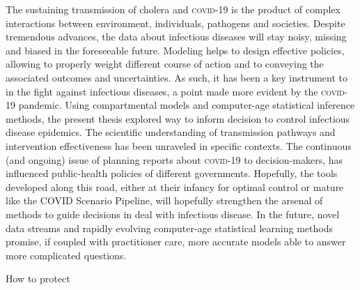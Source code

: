 The sustaining transmission of cholera and \textsc{covid}-19 is the product of complex interactions between environment, individuals, pathogens and societies. Despite tremendous advances, the data about infectious diseases will stay noisy, missing and biased in the foreseeable future. Modeling helps to design effective policies, allowing to properly weight different course of action and to conveying the associated outcomes and uncertainties. As such, it has been a key instrument to in the fight against infectious diseases, a point made more evident by the \textsc{covid}-19 pandemic. Using compartmental models and computer-age statistical inference methods, the present thesis explored way to inform decision to control infectious disease epidemics. The scientific understanding of transmission pathways and intervention effectiveness has been unraveled in specific contexts. The continuous (and ongoing) issue of planning reports about \textsc{covid}-19 to decision-makers, has influenced public-health policies of different governments. Hopefully, the tools developed along this road, either at their infancy for optimal control or mature like the COVID Scenario Pipeline, will hopefully strengthen the arsenal of methods to guide decisions in deal with infectious disease.  In the future, novel data streams and rapidly evolving computer-age statistical learning methods promise, if coupled with practitioner care, more accurate models able to answer more complicated questions. 

How to protect

